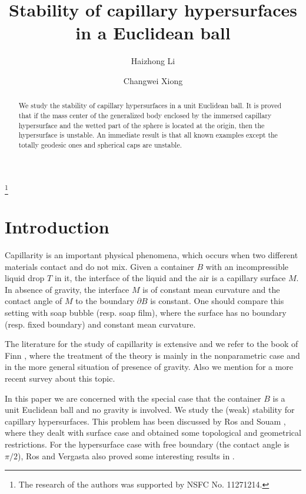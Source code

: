 \documentclass[11pt,reqno]{amsart}
\theoremstyle{definition}
\begin{document}
\title{Stability of capillary hypersurfaces in a Euclidean ball}
\author{Haizhong Li}
\address{Department of mathematical sciences, Tsinghua University, 100084, Beijing, P. R. China}
\author{Changwei Xiong}
\address{Department of mathematical sciences, Tsinghua University, 100084, Beijing, P. R. China}
\thanks{The research of the authors was supported by NSFC No. 11271214.}

\maketitle

\begin{abstract}
We study the stability of capillary hypersurfaces in a unit Euclidean ball. It is proved that if the mass center of the generalized body enclosed by the immersed capillary
hypersurface and the wetted part of the sphere is located at the origin, then the hypersurface is unstable. An immediate result is that all known examples except the totally
geodesic ones and spherical caps are unstable.
\end{abstract}

\section{Introduction}

Capillarity is an important physical phenomena, which occurs when two different materials contact and do not mix. Given a container $B$ with an incompressible liquid drop $T$ in it, the interface of the liquid and the air is a capillary surface $M$. In absence of gravity, the interface $M$ is of constant mean curvature and the contact angle of $M$ to the boundary ${\partial} B$ is constant. One should compare this setting with soap bubble (resp. soap film), where the surface has no boundary (resp. fixed boundary) and constant mean curvature.

The literature for the study of capillarity is extensive and we refer to the book of Finn \cite{F1}, where the treatment of the theory is mainly in the nonparametric case and in the more general situation of presence of gravity. Also we mention \cite{F2} for a more recent survey about this topic.

In this paper we are concerned with the special case that the container $B$ is a unit Euclidean ball and no gravity is involved. We study the (weak) stability for capillary hypersurfaces. This problem has been discussed by Ros and Souam \cite{RS}, where they dealt with surface case and obtained some topological and geometrical restrictions. For the hypersurface case with free boundary (the contact angle is $\pi/2$), Ros and Vergasta also proved some interesting results in \cite{RV}.
\end{document}
